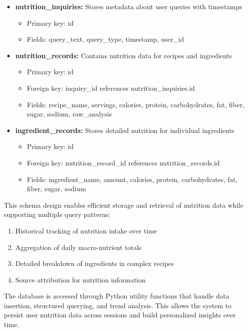\documentclass{ecai}
\begin{document}
\begin{itemize}[noitemsep,topsep=0pt]
    \item \textbf{nutrition\_inquiries:} Stores metadata about user queries with timestamps
    \begin{itemize}[noitemsep,topsep=0pt]
        \item Primary key: id
        \item Fields: query\_text, query\_type, timestamp, user\_id
    \end{itemize}
    \item \textbf{nutrition\_records:} Contains nutrition data for recipes and ingredients
    \begin{itemize}[noitemsep,topsep=0pt]
        \item Primary key: id
        \item Foreign key: inquiry\_id references nutrition\_inquiries.id
        \item Fields: recipe\_name, servings, calories, protein, carbohydrates, fat, fiber, sugar, sodium, raw\_analysis
    \end{itemize}
    \item \textbf{ingredient\_records:} Stores detailed nutrition for individual ingredients
    \begin{itemize}[noitemsep,topsep=0pt]
        \item Primary key: id
        \item Foreign key: nutrition\_record\_id references nutrition\_records.id
        \item Fields: ingredient\_name, amount, calories, protein, carbohydrates, fat, fiber, sugar, sodium
    \end{itemize}
\end{itemize}

This schema design enables efficient storage and retrieval of nutrition data while supporting multiple query patterns:

\begin{enumerate}[noitemsep,topsep=0pt]
    \item Historical tracking of nutrition intake over time
    \item Aggregation of daily macro-nutrient totals
    \item Detailed breakdown of ingredients in complex recipes
    \item Source attribution for nutrition information
\end{enumerate}

The database is accessed through Python utility functions that handle data insertion, structured querying, and trend analysis. This allows the system to persist user nutrition data across sessions and build personalized insights over time.
\end{document}
